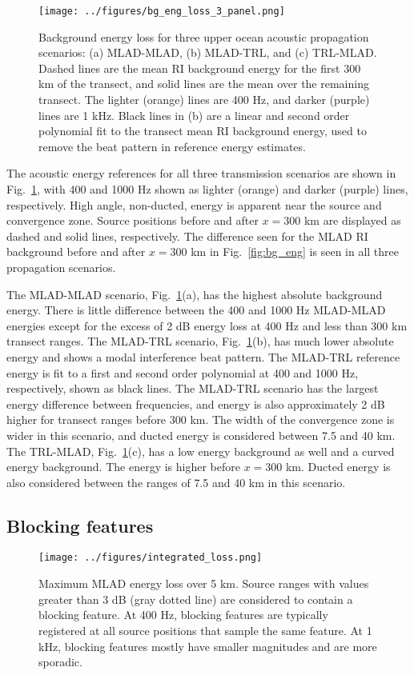 \documentclass[preprint,NumberedRefs]{JASA}
\begin{document}
\begin{figure}
\texttt{[image: ../figures/bg\_eng\_loss\_3\_panel.png]}
        \caption{Background energy loss for three upper ocean acoustic propagation scenarios: (a) MLAD-MLAD, (b) MLAD-TRL, and (c) TRL-MLAD. Dashed lines are the mean RI background energy for the first 300 km of the transect, and solid lines are the mean over the remaining transect. The lighter (orange) lines are 400 Hz, and darker (purple) lines are 1 kHz. Black lines in (b) are a linear and second order polynomial fit to the transect mean RI background energy, used to remove the beat pattern in reference energy estimates.}
    \label{fig:eng_bg_3}
\end{figure}
The acoustic energy references for all three transmission scenarios are shown in Fig.~\ref{fig:eng_bg_3}, with 400 and 1000 Hz shown as lighter (orange) and darker (purple) lines, respectively. High angle, non-ducted, energy is apparent near the source and convergence zone. Source positions before and after $x=300$ km are displayed as dashed and solid lines, respectively. The difference seen for the MLAD RI background before and after $x=300$ km in Fig.~\ref{fig:bg_eng} is seen in all three propagation scenarios.

The MLAD-MLAD scenario, Fig.~\ref{fig:eng_bg_3}(a), has the highest absolute background energy. There is little difference between the 400 and 1000 Hz MLAD-MLAD energies except for the excess of 2 dB energy loss at 400 Hz and less than 300 km transect ranges. The MLAD-TRL scenario, Fig.~\ref{fig:eng_bg_3}(b), has much lower absolute energy and shows a modal interference beat pattern. The MLAD-TRL reference energy is fit to a first and second order polynomial at 400 and 1000 Hz, respectively, shown as black lines. The MLAD-TRL scenario has the largest energy difference between frequencies, and energy is also approximately 2 dB higher for transect ranges before 300 km. The width of the convergence zone is wider in this scenario, and ducted energy is considered between 7.5 and 40 km. The TRL-MLAD, Fig.~\ref{fig:eng_bg_3}(c), has a low energy background as well and a curved energy background. The energy is higher before $x=300$ km. Ducted energy is also considered between the ranges of 7.5 and 40 km in this scenario.

\subsection{Blocking features}\label{ssec:blocking}
\begin{figure}
\texttt{[image: ../figures/integrated\_loss.png]}
    \caption{Maximum MLAD energy loss over 5 km. Source ranges with values greater than 3 dB (gray dotted line) are considered to contain a blocking feature. At 400 Hz, blocking features are typically registered at all source positions that sample the same feature. At 1 kHz, blocking features mostly have smaller magnitudes and are more sporadic.}
    \label{fig:blocking}
\end{figure}
\end{document}
